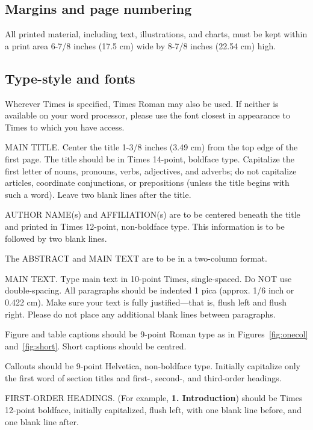 \documentclass[10pt,twocolumn,letterpaper]{article}
\begin{document}
\subsection{Margins and page numbering}

All printed material, including text, illustrations, and charts, must be 
kept within a print area 6-7/8 inches (17.5 cm) wide by 8-7/8 inches 
(22.54 cm) high.


\subsection{Type-style and fonts}

Wherever Times is specified, Times Roman may also be used. If neither is 
available on your word processor, please use the font closest in 
appearance to Times to which you have access.

MAIN TITLE. Center the title 1-3/8 inches (3.49 cm) from the top edge of 
the first page. The title should be in Times 14-point, boldface type. 
Capitalize the first letter of nouns, pronouns, verbs, adjectives, and 
adverbs; do not capitalize articles, coordinate conjunctions, or 
prepositions (unless the title begins with such a word). Leave two blank 
lines after the title.

AUTHOR NAME(s) and AFFILIATION(s) are to be centered beneath the title 
and printed in Times 12-point, non-boldface type. This information is to 
be followed by two blank lines.

The ABSTRACT and MAIN TEXT are to be in a two-column format. 

MAIN TEXT. Type main text in 10-point Times, single-spaced. Do NOT use 
double-spacing. All paragraphs should be indented 1 pica (approx. 1/6 
inch or 0.422 cm). Make sure your text is fully justified---that is, 
flush left and flush right. Please do not place any additional blank 
lines between paragraphs. 

Figure and table captions should be 9-point Roman type as in
Figures~\ref{fig:onecol} and~\ref{fig:short}.  Short captions should be centred.

\noindent Callouts should be 9-point Helvetica, non-boldface type. 
Initially capitalize only the first word of section titles and first-, 
second-, and third-order headings.

FIRST-ORDER HEADINGS. (For example, {\large \bf 1. Introduction}) 
should be Times 12-point boldface, initially capitalized, flush left, 
with one blank line before, and one blank line after.
\end{document}

